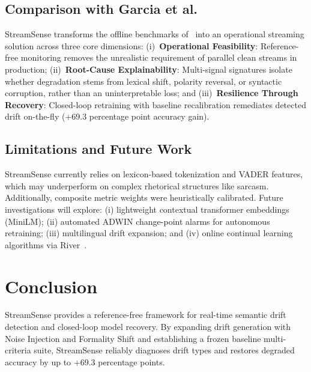 \documentclass[conference]{IEEEtran}
\begin{document}
\subsection{Comparison with Garcia et al.~\cite{garcia2024methods}}
StreamSense transforms the offline benchmarks of~\cite{garcia2024methods} into an operational streaming solution across three core dimensions: (i)~\textbf{Operational Feasibility}: Reference-free monitoring removes the unrealistic requirement of parallel clean streams in production; (ii)~\textbf{Root-Cause Explainability}: Multi-signal signatures isolate whether degradation stems from lexical shift, polarity reversal, or syntactic corruption, rather than an uninterpretable loss; and (iii)~\textbf{Resilience Through Recovery}: Closed-loop retraining with baseline recalibration remediates detected drift on-the-fly (+69.3 percentage point accuracy gain).

\subsection{Limitations and Future Work}
StreamSense currently relies on lexicon-based tokenization and VADER features, which may underperform on complex rhetorical structures like sarcasm. Additionally, composite metric weights were heuristically calibrated. Future investigations will explore: (i) lightweight contextual transformer embeddings (MiniLM); (ii) automated ADWIN change-point alarms for autonomous retraining; (iii) multilingual drift expansion; and (iv) online continual learning algorithms via River~\cite{montiel2021river}.

\section{Conclusion}
StreamSense provides a reference-free framework for real-time semantic drift detection and closed-loop model recovery. By expanding drift generation with Noise Injection and Formality Shift and establishing a frozen baseline multi-criteria suite, StreamSense reliably diagnoses drift types and restores degraded accuracy by up to +69.3 percentage points.

\balance


\end{document}
